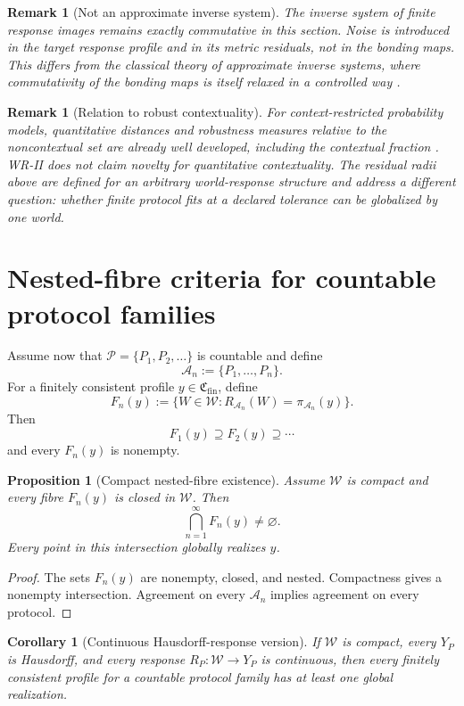 \documentclass[11pt]{article}
\newtheorem{proposition}[definition]{Proposition}
\newtheorem{corollary}[definition]{Corollary}
\newtheorem{remark}[definition]{Remark}
\newcommand{\W}{\mathcal W}
\newcommand{\Pcal}{\mathcal P}
\newcommand{\Acal}{\mathcal A}
\newcommand{\Cfin}{\mathfrak C_{\mathrm{fin}}}
\begin{document}
\begin{remark}[Not an approximate inverse system]
The inverse system of finite response images remains exactly commutative in
this section. Noise is introduced in the target response profile and in its
metric residuals, not in the bonding maps. This differs from the classical
theory of approximate inverse systems, where commutativity of the bonding
maps is itself relaxed in a controlled way
\cite{MardesicRubin1989,MardesicSegal1989}.
\end{remark}

\begin{remark}[Relation to robust contextuality]
For context-restricted probability models, quantitative distances and
robustness measures relative to the noncontextual set are already well
developed, including the contextual fraction
\cite{AbramskyBarbosaMansfield2017}. WR-II does not claim novelty for
quantitative contextuality. The residual radii above are defined for an
arbitrary world-response structure and address a different question: whether
finite protocol fits at a declared tolerance can be globalized by one world.
\end{remark}


\section{Nested-fibre criteria for countable protocol families}

Assume now that $\Pcal=\{P_1,P_2,\ldots\}$ is countable and define
\[
\Acal_n:=\{P_1,\ldots,P_n\}.
\]
For a finitely consistent profile $y\in\Cfin$, define
\[
F_n(y)
:=
\{W\in\W:R_{\Acal_n}(W)=\pi_{\Acal_n}(y)\}.
\]
Then
\[
F_1(y)\supseteq F_2(y)\supseteq\cdots
\]
and every $F_n(y)$ is nonempty.

\begin{proposition}[Compact nested-fibre existence]
Assume $\W$ is compact and every fibre $F_n(y)$ is closed in $\W$. Then
\[
\bigcap_{n=1}^{\infty}F_n(y)\neq\varnothing.
\]
Every point in this intersection globally realizes $y$.
\end{proposition}

\begin{proof}
The sets $F_n(y)$ are nonempty, closed, and nested. Compactness gives a
nonempty intersection. Agreement on every $\Acal_n$ implies agreement on every
protocol.
\end{proof}

\begin{corollary}[Continuous Hausdorff-response version]
If $\W$ is compact, every $Y_P$ is Hausdorff, and every response
$R_P:\W\to Y_P$ is continuous, then every finitely consistent profile for a
countable protocol family has at least one global realization.
\end{corollary}
\end{document}
